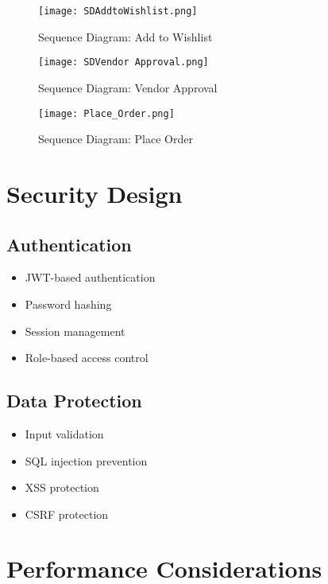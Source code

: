 \begin{figure}[h]
    \centering
    \texttt{[image: SDAddtoWishlist.png]}
    \caption{Sequence Diagram: Add to Wishlist}
    \label{fig:sd-add-wishlist}
\end{figure}

\begin{figure}[h]
    \centering
    \texttt{[image: SDVendor Approval.png]}
    \caption{Sequence Diagram: Vendor Approval}
    \label{fig:sd-vendor-approval}
\end{figure}

\begin{figure}[h]
    \centering
    \texttt{[image: Place\_Order.png]}
    \caption{Sequence Diagram: Place Order}
    \label{fig:sd-place-order}
\end{figure}

\section{Security Design}
\subsection{Authentication}
\begin{itemize}
    \item JWT-based authentication
    \item Password hashing
    \item Session management
    \item Role-based access control
\end{itemize}

\subsection{Data Protection}
\begin{itemize}
    \item Input validation
    \item SQL injection prevention
    \item XSS protection
    \item CSRF protection
\end{itemize}

\section{Performance Considerations}
